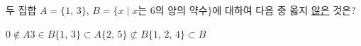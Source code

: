 두 집합 $A=\{1,\,3\}$, $B=\{x \mid x$는 $6$의 양의 약수$\}$에 대하여 다음 중 옳지 \underline{않은} 것은?
\begin{choices32}{$0\notin A$}{$3\in B$}{$\{1,\,3\}\subset A$}{$\{2,\,5\}\not\subset B$}{$\{1,\,2,\,4\}\subset B$}\end{choices32}
